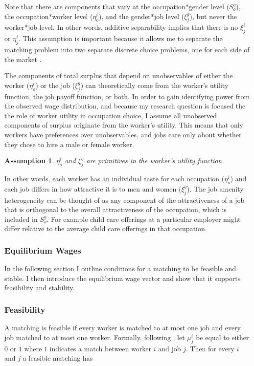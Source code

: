 \documentclass[12pt]{article}
\newtheorem{assumption}{Assumption}
\begin{document}
Note that there are components that vary at the occupation*gender level ($S^g_o$), the occupation*worker level ($\eta^i_o$), and the gender*job level ($\xi^g_j$), but never the worker*job level. In other words, additive separability implies that there is no $\xi^i_j$ or $\eta^i_j$. This assumption is important because it allows me to separate the matching problem into two separate discrete choice problems, one for each side of the market \cite{Galichon2013}.

The components of total surplus that depend on unobservables of either the worker ($\eta^i_o$) or the job ($\xi^g_j$) can theoretically come from the worker's utility function, the job payoff function, or both. In order to gain identifying power from the observed wage distribution, and because my research question is focused the the role of worker utility in occupation choice, I assume all unobserved components of surplus originate from the worker's utility. This means that only workers have preferences over unobservables, and jobs care only about whether they chose to hire a male or female worker.

\begin{assumption}
$\eta^i_o$ and $\xi^g_j$ are primitives in the worker's utility function.
\end{assumption}

In other words, each worker has an individual taste for each occupation ($\eta^i_o$) and each job differs in how attractive it is to men and women ($\xi^g_j$). The job amenity heterogeneity can be thought of as any component of the attractiveness of a job that is orthogonal to the overall attractiveness of the occupation, which is included in $S^g_o$. For example child care offerings at a particular employer might differ relative to the average child care offerings in that occupation.


\subsubsection{Equilibrium Wages} \label{equilibrium}
In the following section I outline conditions for a matching to be feasible and stable. I then introduce the equilibrium wage vector and show that it supports feasibility and stability.

\subsubsection{Feasibility}
A matching is feasible if every worker is matched to at most one job and every job matched to at most one worker. Formally, following , let $\mu^i_j$ be equal to either $0$ or $1$ where $1$ indicates a match between worker $i$ and job $j$. Then for every $i$ and $j$ a feasible matching has
\end{document}

